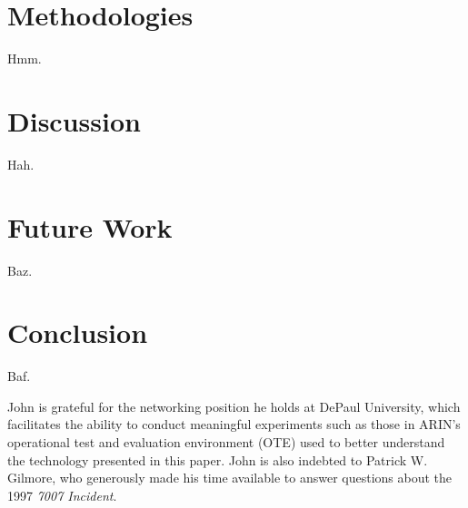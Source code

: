 \documentclass[sigconf]{acmart}
\begin{document}
\section{Methodologies}\label{sec:Methodologies}

Hmm.

\section{Discussion}\label{sec:Discussion}

Hah.

\section{Future Work}\label{sec:Future Work}

Baz.

\section{Conclusion}\label{sec:Conclusion}

Baf.

\begin{acks}

John is grateful for the networking position he holds at DePaul
University, which facilitates the ability to conduct meaningful
experiments such as those in ARIN's operational test and evaluation
environment (OTE) used to better understand the technology presented in
this paper.  John is also indebted to Patrick W.  Gilmore, who
generously made his time available to answer questions about the 1997
\emph{7007 Incident}.

\end{acks}


\end{document}
